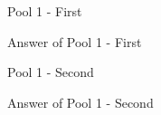 \begin{question}
Pool 1 - First
\end{question}
\begin{solution}
Answer of Pool 1 - First
\end{solution}

\begin{question}
Pool 1 - Second
\end{question}
\begin{solution}
Answer of Pool 1 - Second
\end{solution}
